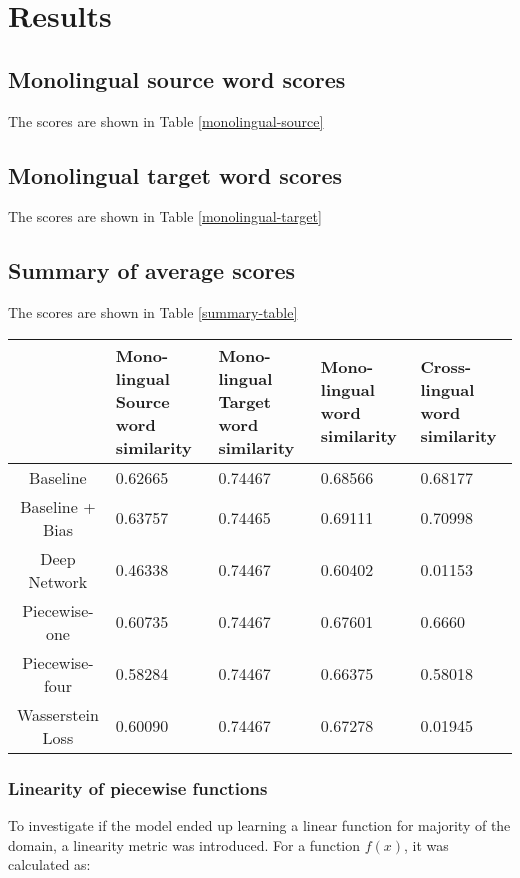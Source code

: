 \documentclass[11pt]{article}
\begin{document}
\section{Results}
\subsection{Monolingual source word scores}
The scores are shown in Table \ref{monolingual-source}

\subsection{Monolingual target word scores}
The scores are shown in Table \ref{monolingual-target}

\subsection{Summary of average scores}
The scores are shown in Table \ref{summary-table}

\begin{table*}[ht]
  \begin{center}
  \begin{tabular}{|c|l|l|l|l|}
  \hline
   & \multicolumn{1}{|p{3cm}|}{Mono-lingual Source word similarity}& \multicolumn{1}{|p{3cm}|}{Mono-lingual Target word similarity} & \multicolumn{1}{|p{3cm}|}{Mono-lingual word similarity} & \multicolumn{1}{|p{3cm}|}{Cross-lingual word similarity} \\
  \hline
  Baseline & 0.62665 & 0.74467 & 0.68566 & 0.68177  \\
  \hline
  Baseline + Bias & 0.63757 & 0.74465 & 0.69111 & 0.70998 \\
  \hline
  Deep Network & 0.46338 & 0.74467 & 0.60402 & 0.01153 \\
  \hline
  Piecewise-one & 0.60735 & 0.74467 & 0.67601 & 0.6660 \\
  \hline
  Piecewise-four & 0.58284 & 0.74467 & 0.66375 & 0.58018 \\
  \hline
  Wasserstein Loss & 0.60090 & 0.74467 & 0.67278 & 0.01945 \\
  \hline
  \end{tabular}
  \end{center}
  \caption{ Comparison of average scores for different experiments with English as source language and Spanish as target language}
  \label{summary-table}
\end{table*}

\subsubsection{Linearity of piecewise functions}
To investigate if the model ended up learning a linear function for majority of the domain, a linearity metric was introduced. For a function $f(x)$, it was calculated as:
\end{document}
